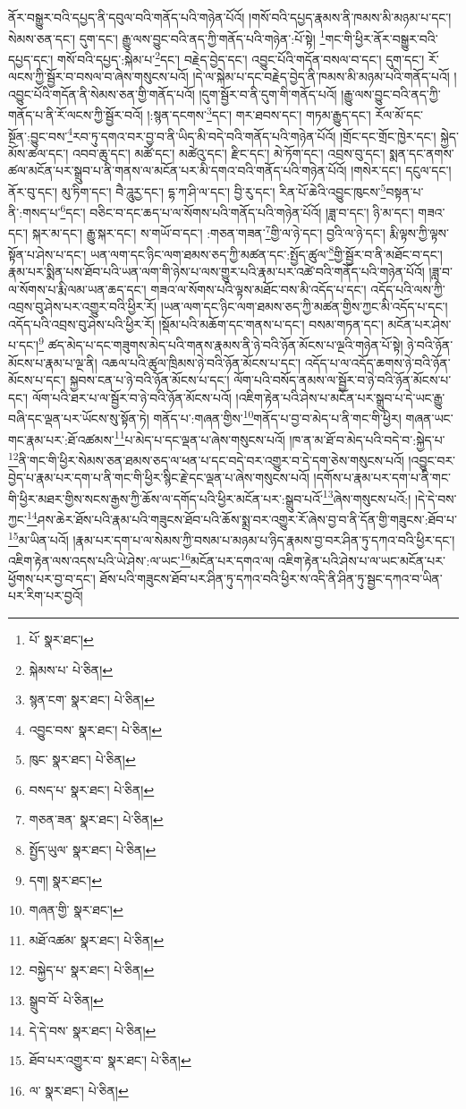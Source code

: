 ནོར་བསྒྱུར་བའི་དཔྱད་ནི་དབུལ་བའི་གནོད་པའི་གཉེན་པོའོ། །གསོ་བའི་དཔྱད་རྣམས་ནི་ཁམས་མི་མཉམ་པ་དང་། སེམས་ཅན་དང་། དུག་དང་། རྒྱུ་ལས་བྱུང་བའི་ནད་ཀྱི་གནོད་པའི་གཉེན་:པོ་སྟེ། \footnote{པོ་  སྣར་ཐང་། }གང་གི་ཕྱིར་ནོར་བསྒྱུར་བའི་དཔྱད་དང་། གསོ་བའི་དཔྱད་:སྐེམ་པ་\footnote{སྐེམས་པ་  པེ་ཅིན། }དང་། བརྗེད་བྱེད་དང་། འབྱུང་པོའི་གདོན་བསལ་བ་དང་། དུག་དང་། རོ་ལངས་ཀྱི་སྦྱོར་བ་བསལ་བ་ཞེས་གསུངས་པའོ། །དེ་ལ་སྐེམ་པ་དང་བརྗེད་བྱེད་ནི་ཁམས་མི་མཉམ་པའི་གནོད་པའོ། །འབྱུང་པོའི་གདོན་ནི་སེམས་ཅན་གྱི་གནོད་པའོ། །དུག་སྦྱོར་བ་ནི་དུག་གི་གནོད་པའོ། །རྒྱུ་ལས་བྱུང་བའི་ནད་ཀྱི་གནོད་པ་ནི་རོ་ལངས་ཀྱི་སྦྱོར་བའོ། །:སྙན་དངགས་\footnote{སྙན་ངག་  སྣར་ཐང་།  པེ་ཅིན། }དང་། གར་ཐབས་དང་། གཏམ་རྒྱུད་དང་། རོལ་མོ་དང་སྔོན་:བྱུང་བས་\footnote{འབྱུང་བས་  སྣར་ཐང་།  པེ་ཅིན། }རབ་ཏུ་དགའ་བར་བྱ་བ་ནི་ཡིད་མི་བདེ་བའི་གནོད་པའི་གཉེན་པོའོ། །གྲོང་དང་གྲོང་ཁྱེར་དང་། སྐྱེད་མོས་ཚལ་དང་། འབབ་ཆུ་དང་། མཚོ་དང་། མཚེའུ་དང་། རྫིང་དང་། མེ་ཏོག་དང་། འབྲས་བུ་དང་། སྨན་དང་ནགས་ཚལ་མངོན་པར་སྒྲུབ་པ་ནི་གནས་ལ་མངོན་པར་མི་དགའ་བའི་གནོད་པའི་གཉེན་པོའོ། །གསེར་དང་། དངུལ་དང་། ནོར་བུ་དང་། མུ་ཏིག་དང་། བཻ་ཌཱུརྱ་དང་། དྷ་ཀ་ཤི་ལ་དང་། བྱི་རུ་དང་། རིན་པོ་ཆེའི་འབྱུང་ཁུངས་\footnote{ཁུང་  སྣར་ཐང་།  པེ་ཅིན། }བསྟན་པ་ནི་:གསད་པ་\footnote{བསད་པ་  སྣར་ཐང་།  པེ་ཅིན། }དང་། བཅིང་བ་དང་ཆད་པ་ལ་སོགས་པའི་གནོད་པའི་གཉེན་པོའོ། །ཟླ་བ་དང་། ཉི་མ་དང་། གཟའ་དང་། སྐར་མ་དང་། རྒྱུ་སྐར་དང་། ས་གཡོ་བ་དང་། :གཅན་གཟན་\footnote{གཅན་ཟན་  སྣར་ཐང་།  པེ་ཅིན། }གྱི་ལ་ཉེ་དང་། བྱའི་ལ་ཉེ་དང་། རྨི་ལྟས་ཀྱི་ལྟས་སྟོན་པ་ཤེས་པ་དང་། ཡན་ལག་དང་ཉིང་ལག་ཐམས་ཅད་ཀྱི་མཚན་དང་:སྤྱོད་ཚུལ་\footnote{སྤྱོད་ཡུལ་  སྣར་ཐང་།  པེ་ཅིན། }གྱི་སྦྱོར་བ་ནི་མཐོང་བ་དང་། རྣམ་པར་སྨིན་པས་ཐོབ་པའི་ཡན་ལག་གི་ཉེས་པ་ལས་གྱུར་པའི་རྣམ་པར་འཚེ་བའི་གནོད་པའི་གཉེན་པོའོ། །ཟླ་བ་ལ་སོགས་པ་རྨི་ལམ་ཡན་ཆད་དང་། གཟའ་ལ་སོགས་པའི་ལྟས་མཐོང་བས་མི་འདོད་པ་དང་། འདོད་པའི་ལས་ཀྱི་འབྲས་བུ་ཤེས་པར་འགྱུར་བའི་ཕྱིར་རོ། །ཡན་ལག་དང་ཉིང་ལག་ཐམས་ཅད་ཀྱི་མཚན་གྱིས་ཀྱང་མི་འདོད་པ་དང་། འདོད་པའི་འབྲས་བུ་ཤེས་པའི་ཕྱིར་རོ། །སྡོམ་པའི་མཆོག་དང་གནས་པ་དང་། བསམ་གཏན་དང་། མངོན་པར་ཤེས་པ་དང་།\footnote{དག།  སྣར་ཐང་། } ཚད་མེད་པ་དང་གཟུགས་མེད་པའི་གནས་རྣམས་ནི་ཉེ་བའི་ཉོན་མོངས་པ་ལྔའི་གཉེན་པོ་སྟེ། ཉེ་བའི་ཉོན་མོངས་པ་རྣམ་པ་ལྔ་ནི། འཆལ་པའི་ཚུལ་ཁྲིམས་ཉེ་བའི་ཉོན་མོངས་པ་དང་། འདོད་པ་ལ་འདོད་ཆགས་ཉེ་བའི་ཉོན་མོངས་པ་དང་། སྐྱབས་ངན་པ་ཉེ་བའི་ཉོན་མོངས་པ་དང་། ལོག་པའི་བསོད་ནམས་ལ་སྦྱོར་བ་ཉེ་བའི་ཉོན་མོངས་པ་དང་། ལོག་པའི་ཐར་པ་ལ་སྦྱོར་བ་ཉེ་བའི་ཉོན་མོངས་པའོ། །འཇིག་རྟེན་པའི་ཤེས་པ་མངོན་པར་སྒྲུབ་པ་དེ་ཡང་རྒྱུ་བཞི་དང་ལྡན་པར་ཡོངས་སུ་སྟོན་ཏེ། གནོད་པ་:གཞན་གྱིས་\footnote{གཞན་གྱི་  སྣར་ཐང་། }གནོད་པ་བྱ་བ་མེད་པ་ནི་གང་གི་ཕྱིར། གཞན་ཡང་གང་རྣམ་པར་:ཐོ་འཚམས་\footnote{མཐོ་འཚམ་  སྣར་ཐང་།  པེ་ཅིན། }པ་མེད་པ་དང་ལྡན་པ་ཞེས་གསུངས་པའོ། །ཁ་ན་མ་ཐོ་བ་མེད་པའི་བདེ་བ་:སྐྱེད་པ་\footnote{བསྐྱེད་པ་  སྣར་ཐང་།  པེ་ཅིན། }ནི་གང་གི་ཕྱིར་སེམས་ཅན་ཐམས་ཅད་ལ་ཕན་པ་དང་བདེ་བར་འགྱུར་བ་དེ་དག་ཅེས་གསུངས་པའོ། །འབྱུང་བར་བྱེད་པ་རྣམ་པར་དག་པ་ནི་གང་གི་ཕྱིར་སྙིང་རྗེ་དང་ལྡན་པ་ཞེས་གསུངས་པའོ། །དགོས་པ་རྣམ་པར་དག་པ་ནི་གང་གི་ཕྱིར་མཐར་གྱིས་སངས་རྒྱས་ཀྱི་ཆོས་ལ་དགོད་པའི་ཕྱིར་མངོན་པར་:སྒྲུབ་པའོ་\footnote{སྒྲུབ་བོ་  པེ་ཅིན། }ཞེས་གསུངས་པའོ:། །དེ་དེ་བས་ཀྱང་\footnote{དེ་དེ་བས་  སྣར་ཐང་།  པེ་ཅིན། }ཤས་ཆེར་ཐོས་པའི་རྣམ་པའི་གཟུངས་ཐོབ་པའི་ཆོས་སྨྲ་བར་འགྱུར་རོ་ཞེས་བྱ་བ་ནི་དོན་གྱི་གཟུངས་:ཐོབ་པ་\footnote{ཐོབ་པར་འགྱུར་བ་  སྣར་ཐང་།  པེ་ཅིན། }མ་ཡིན་པའོ། །རྣམ་པར་དག་པ་ལ་སེམས་ཀྱི་བསམ་པ་མཉམ་པ་ཉིད་རྣམས་བྱ་བར་ཤིན་ཏུ་དཀའ་བའི་ཕྱིར་དང་། འཇིག་རྟེན་ལས་འདས་པའི་ཡེ་ཤེས་:ལ་ཡང་\footnote{ལ་  སྣར་ཐང་།  པེ་ཅིན། }མངོན་པར་དགའ་ལ། འཇིག་རྟེན་པའི་ཤེས་པ་ལ་ཡང་མངོན་པར་ཕྱོགས་པར་བྱ་བ་དང་། ཐོས་པའི་གཟུངས་ཐོབ་པར་ཤིན་ཏུ་དཀའ་བའི་ཕྱིར་ས་འདི་ནི་ཤིན་ཏུ་སྦྱང་དཀའ་བ་ཡིན་པར་རིག་པར་བྱའོ། 